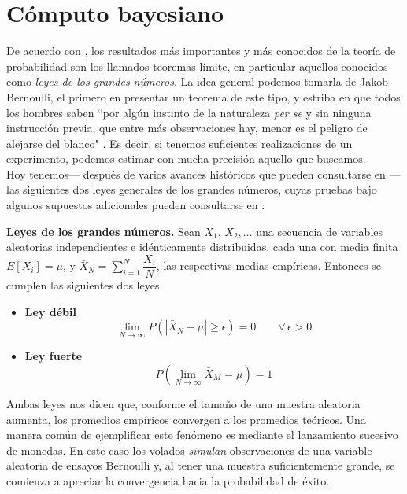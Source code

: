 \chapter{Cómputo bayesiano}

De acuerdo con \textcite{Ross10}, los resultados más importantes y más conocidos de la teoría de probabilidad son los llamados teoremas límite, en particular aquellos conocidos como \textit{leyes de los grandes números}. La idea general podemos tomarla de Jakob Bernoulli, el primero en presentar un teorema de este tipo, y estriba en que todos los hombres saben ``por algún instinto de la naturaleza \textit{per se} y sin ninguna instrucción previa, que entre más observaciones hay, menor es el peligro de alejarse del blanco" \parencite{Pulskamp09}. Es decir, si tenemos suficientes realizaciones de un experimento, podemos estimar con mucha precisión aquello que buscamos.\\

Hoy tenemos--- después de varios avances históricos que pueden consultarse en \textcite{Seneta13}--- las siguientes dos leyes generales de los grandes números, cuyas pruebas bajo algunos supuestos adicionales pueden consultarse en \textcite{Ross10}:

\begin{teo} \label{teo:LGN}
\textbf{Leyes de los grandes números.}
Sean $X_1,\,X_2,\dots$ una secuencia de variables aleatorias independientes e idénticamente distribuidas, cada una con media finita $E[X_i]=\mu$, y $\bar{X}_N=\sum\limits_{i=1}^N\dfrac{X_i}{N}$, las respectivas medias empíricas. Entonces se cumplen las siguientes dos leyes.
\begin{itemize}
\item \textbf{Ley débil}
\begin{equation*}
\lim_{N \to \infty} P\left( |\bar{X}_N-\mu| \geq \epsilon \right)  = 0 \qquad \forall \, \epsilon > 0
\end{equation*}
\item \textbf{Ley fuerte}
\begin{equation*}
P\left(\lim_{N \to \infty} \bar{X}_M = \mu \right)  = 1 
\end{equation*}
\end{itemize}
\end{teo}

Ambas leyes nos dicen que, conforme el tamaño de una muestra aleatoria aumenta, los promedios empíricos convergen a los promedios teóricos. Una manera común de ejemplificar este fenómeno es mediante el lanzamiento sucesivo de monedas. En este caso los volados \textit{simulan} observaciones de una variable aleatoria de ensayos Bernoulli y, al tener una muestra suficientemente grande, se comienza a apreciar la convergencia hacia la probabilidad de éxito.\\ 

